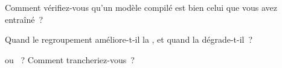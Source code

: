 \begin{interviewq}\label{iq:ml:low-latency-inference:4}
Comment vérifiez-vous qu'un modèle compilé est bien celui que vous avez entraîné~?
\end{interviewq}

\begin{interviewq}\label{iq:ml:low-latency-inference:5}
Quand le regroupement améliore-t-il la , et quand la dégrade-t-il~?
\end{interviewq}

\begin{interviewq}\label{iq:ml:low-latency-inference:6}
 ou ~? Comment trancheriez-vous~?
\end{interviewq}
